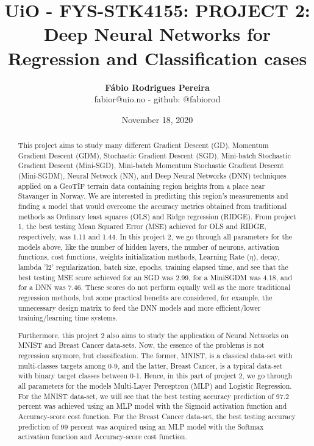 \documentclass{article}
\title{UiO - FYS-STK4155: PROJECT 2: Deep Neural Networks for Regression and Classification cases}
\author{\textbf{Fábio Rodrigues Pereira} \\ \small fabior@uio.no - github: @fabiorod}
\date{November 18, 2020}
\begin{document}
\maketitle
\begin{abstract}
\noindent This project aims to study many different Gradient Descent (GD), Momentum Gradient Descent (GDM), Stochastic Gradient Descent (SGD), Mini-batch Stochastic Gradient Descent (Mini-SGD), Mini-batch Momentum Stochastic Gradient Descent (Mini-SGDM), Neural Network (NN), and Deep Neural Networks (DNN) techniques applied on a GeoTIF terrain data containing region heights from a place near Stavanger in Norway. We are interested in predicting this region's measurements and finding a model that would overcome the accuracy metrics obtained from traditional methods as Ordinary least squares (OLS) and Ridge regression (RIDGE). From project 1, the best testing Mean Squared Error (MSE) achieved for OLS and RIDGE, respectively, was 1.11 and 1.44. In this project 2, we go through all parameters for the models above, like the number of hidden layers, the number of neurons, activation functions, cost functions, weights initialization methods, Learning Rate ($\eta$), decay, lambda 'l2' regularization, batch size, epochs, training elapsed time, and see that the best testing MSE score achieved for an SGD was 2.99, for a MiniSGDM was 4.18, and for a DNN was 7.46. These scores do not perform equally well as the more traditional regression methods, but some practical benefits are considered, for example, the unnecessary design matrix to feed the DNN models and more efficient/lower training/learning time systems.

Furthermore, this project 2 also aims to study the application of Neural Networks on MNIST and Breast Cancer data-sets. Now, the essence of the problems is not regression anymore, but classification. The former, MNIST, is a classical data-set with multi-classes targets among 0-9, and the latter, Breast Cancer, is a typical data-set with binary target classes between 0-1. Hence, in this part of project 2, we go through all parameters for the models Multi-Layer Perceptron (MLP) and Logistic Regression. For the MNIST data-set, we will see that the best testing accuracy prediction of 97.2 percent was achieved using an MLP model with the Sigmoid activation function and Accuracy-score cost function. For the Breast Cancer data-set, the best testing accuracy prediction of 99 percent was acquired using an MLP model with the Softmax activation function and Accuracy-score cost function.
\end{abstract}
\end{document}
